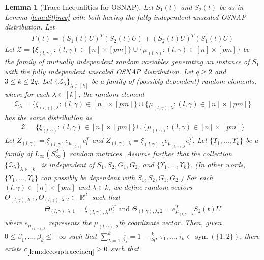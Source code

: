 \documentclass[11pt]{amsart}
\numberwithin{equation}{section}
\numberwithin{equation}{section}
\DeclareMathOperator{\R}{\mathbb{R}}
\DeclareMathOperator{\sym}{sym}
\newtheorem{lemma}[theorem]{Lemma}
\theoremstyle{remark}
\theoremstyle{definition}
\begin{document}
\begin{lemma} [Trace Inequalities for OSNAP]\label{lem:decouptraceineq}
Let $S_1(t)$ and $S_2(t)$ be as in Lemma \ref{lem:diffineq} with both having the fully independent unscaled OSNAP distribution. Let
\begin{align*}\Gamma(t)=(S_1(t)U)^T(S_2(t)U)+(S_2(t)U)^T(S_1(t)U)\end{align*} Let $\mathcal{Z}=\{\xi_{(l,\gamma)}:(l,\gamma) \in [n] \times [pm]\} \cup \{\mu_{(l,\gamma)}:(l,\gamma) \in [n] \times [pm]\}$ be the family of mutually independent random variables generating an instance of $S_1$ with the fully independent  unscaled OSNAP distribution. Let $q \ge 2$ and $3 \le k \le 2q$. Let $\{\mathcal{Z}_{\lambda}\}_{\lambda \in [k]}$ be a family of (possibly dependent) random elements, where for each $\lambda \in [k]$, the random element
\begin{align*}
    \mathcal{Z}_{\lambda}=\{\xi_{(l,\gamma),\lambda}:(l,\gamma) \in [n] \times [pm]\} \cup \{\mu_{(l,\gamma),\lambda}:(l,\gamma) \in [n] \times [pm]\}
\end{align*}
has the same distribution as 
\begin{align*}
    \mathcal{Z}=\{\xi_{(l,\gamma)}:(l,\gamma) \in [n] \times [pm]\} \cup \{\mu_{(l,\gamma)}:(l,\gamma) \in [n] \times [pm]\}
\end{align*}
Let $Z_{(l,\gamma)}=\xi_{(l,\gamma)} e_{\mu_{(l, \gamma)}} e_l ^T$ and $Z_{(l,\gamma),\lambda}=\xi_{(l,\gamma),\lambda} e_{\mu_{(l, \gamma),\lambda}} e_l ^T$.
Let $\{\Upsilon_1,...,\Upsilon_k\}$ be a family of $L_{\infty}(S_{\infty}^d)$ random matrices.
Assume further that the collection $\{\mathcal{Z}_{\lambda}\}_{\lambda \in [k]}$ is independent of $S_1, S_2, G_1, G_2$, and $\{\Upsilon_1,...,\Upsilon_k\}$. (In other words, $\{\Upsilon_1,...,\Upsilon_k\}$ can possibly be dependent with $S_1, S_2, G_1, G_2$.)
For each $(l,\gamma) \in [n] \times [pm]$ and $\lambda \in k$, we define random vectors $\Theta_{(l,\gamma), \lambda, 1}, \Theta_{(l,\gamma), \lambda, 2} \in \R^d$ such that
\begin{align*}
    \Theta_{(l,\gamma), \lambda, 1} = \xi_{(l,\gamma),\lambda} u_l^T \text{ and } \Theta_{(l,\gamma), \lambda, 2} = e_{\mu_{(l,\gamma),\lambda}}^TS_2(t)U
\end{align*}
where $e_{\mu_{(l,\gamma),\lambda}}$ represents the $\mu_{(l,\gamma),\lambda}$th coordinate vector. Then, given $0 \le \beta_1,...,\beta_k \le +\infty$ such that $\sum \limits_{\lambda=1}^k \frac{1}{\beta_{\lambda}}=1-\frac{k}{2q}$, $\tau_1, \ldots, \tau_k \in \sym(\{1,2 \})$, there exists $c_{\ref*{lem:decouptraceineq}}>0$ such that

\end{lemma}
\end{document}
